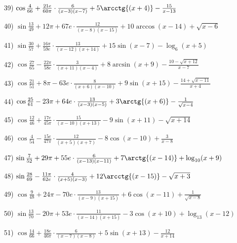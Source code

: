 \documentclass[11pt,ukrainian]{article}
\begin{document}
39) \space 
{ ${\cos\frac{4}{66}} + \frac{21 e}{60{\pi}}\cdot {\frac{6}{(x - 3)(x - 7)}} + {5\arcctg{(x + 4)}} - { \frac{15}{x - 13}}$}
\smallskip\par
40) \space 
{ ${\sin\frac{13}{49}} + 12{\pi} + 67 e\cdot {\frac{12}{(x - 8)(x - 15)}} + {10\arccos{(x - 14)}} + {\sqrt{x - 6}}$}
\smallskip\par
41) \space 
{ ${\sin\frac{30}{57}} + \frac{16{\pi}}{59 e}\cdot {\frac{13}{(x - 12)(x + 14)}} + {15\sin{(x - 7)}} - {\log_{6}(x + 5)}$}
\smallskip\par
42) \space 
{ ${\cos\frac{27}{65}} - \frac{22{\pi}}{58 e}\cdot {\frac{3}{(x + 11)(x - 4)}} + {8\arcsin{(x + 9)}} - {\frac{10 - \sqrt{x + 12}}{x - 7}}$}
\smallskip\par
43) \space 
{ ${\cos\frac{21}{51}} + 8{\pi} - 63 e\cdot {\frac{8}{(x + 6)(x - 10)}} + {9\sin{(x + 15)}} - {\frac{14 + \sqrt{x - 11}}{x + 4}}$}
\smallskip\par
44) \space 
{ ${\cos\frac{25}{61}} - 23{\pi} + 64 e\cdot {\frac{13}{(x - 3)(x - 5)}} + {3\arctg{(x + 6)}} - {\frac{1}{\sqrt{x - 4}}}$}
\smallskip\par
45) \space 
{ ${\cos\frac{12}{46}} + \frac{17 e}{45{\pi}}\cdot {\frac{15}{(x - 10)(x + 13)}} - {9\sin{(x + 11)}} - {\sqrt{x + 14}}$}
\smallskip\par
46) \space 
{ ${\cos\frac{4}{54}} - \frac{15 e}{47{\pi}}\cdot {\frac{12}{(x + 5)(x + 7)}} - {8\cos{(x - 10)}} + { \frac{3}{x - 8}}$}
\smallskip\par
47) \space 
{ ${\sin\frac{7}{52}} + 29{\pi} + 55 e\cdot {\frac{6}{(x - 13)(x - 11)}} + {7\arctg{(x - 14)}} + {\log_{10}(x + 9)}$}
\smallskip\par
48) \space 
{ ${\sin\frac{28}{69}} - \frac{11{\pi}}{62 e}\cdot {\frac{4}{(x + 5)(x - 3)}} + {12\arcctg{(x - 15)}} - {\sqrt{x + 3}}$}
\smallskip\par
49) \space 
{ ${\cos\frac{9}{48}} + 24{\pi} - 70 e\cdot {\frac{13}{(x - 9)(x + 15)}} + {6\cos{(x - 11)}} + {\frac{1}{\sqrt{x - 8}}}$}
\smallskip\par
50) \space 
{ ${\sin\frac{13}{70}} - 20{\pi} + 53 e\cdot {\frac{11}{(x - 14)(x + 15)}} - {3\cos{(x + 10)}} + {\log_{13}(x - 12)}$}
\smallskip\par
51) \space 
{ ${\cos\frac{14}{66}} + \frac{18 e}{46{\pi}}\cdot {\frac{6}{(x - 7)(x - 8)}} + {5\sin{(x + 13)}} - { \frac{12}{x + 14}}$}
\smallskip\par
\end{document}
